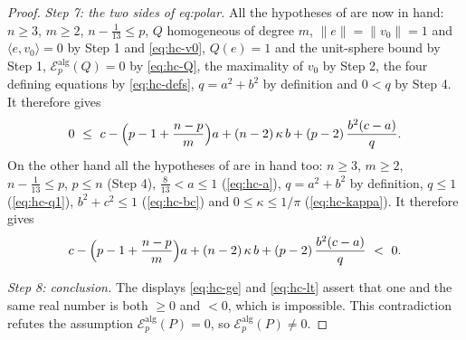 \begin{proof}
\emph{Step 7: the two sides of eq:polar.} All the hypotheses of
 are now in hand: $n\ge3$, $m\ge2$,
$n-\tfrac1{13}\le p$, $Q$ homogeneous of degree $m$,
$\lVert e\rVert=\lVert v_0\rVert=1$ and $\langle e,v_0\rangle=0$ by Step 1 and
\eqref{eq:hc-v0}, $Q(e)=1$ and the unit-sphere bound by Step 1,
$\mathcal{E}^{\mathrm{alg}}_p(Q)=0$ by \eqref{eq:hc-Q}, the maximality of $v_0$
by Step 2, the four defining equations by \eqref{eq:hc-defs}, $q=a^2+b^2$ by
definition and $0<q$ by Step 4. It therefore gives
\begin{equation}\label{eq:hc-ge}
  0\ \le\ c-\Bigl(p-1+\frac{n-p}{m}\Bigr)a+(n-2)\,\kappa\,b
    +(p-2)\,\frac{b^2(c-a)}{q}.
\end{equation}
On the other hand all the hypotheses of  are in
hand too: $n\ge3$, $m\ge2$, $n-\tfrac1{13}\le p$, $p\le n$ (Step 4),
$\tfrac8{13}<a\le1$ (\eqref{eq:hc-a}), $q=a^2+b^2$ by definition, $q\le1$
(\eqref{eq:hc-q1}), $b^2+c^2\le1$ (\eqref{eq:hc-bc}) and
$0\le\kappa\le1/\pi$ (\eqref{eq:hc-kappa}). It therefore gives
\begin{equation}\label{eq:hc-lt}
  c-\Bigl(p-1+\frac{n-p}{m}\Bigr)a+(n-2)\,\kappa\,b
    +(p-2)\,\frac{b^2(c-a)}{q}\ <\ 0 .
\end{equation}

\emph{Step 8: conclusion.} The displays \eqref{eq:hc-ge} and \eqref{eq:hc-lt}
assert that one and the same real number is both $\ge0$ and $<0$, which is
impossible. This contradiction refutes the assumption
$\mathcal{E}^{\mathrm{alg}}_p(P)=0$, so
$\mathcal{E}^{\mathrm{alg}}_p(P)\ne0$.
\end{proof}
